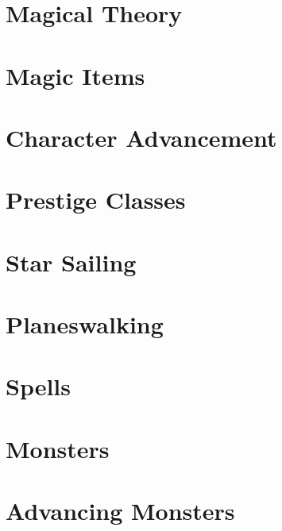 \documentclass[12pt,oneside,onecolumn,openany,final]{memoir}
\begin{document}
\chapter{Magical Theory}
\clearpage{}
\chapter{Magic Items}
\clearpage{}
\chapter{Character Advancement}
\clearpage{}
\chapter{Prestige Classes}
\clearpage{}
\chapter{Star Sailing}
\clearpage{}
\chapter{Planeswalking}

\appendix{}
\appendixpage{}

\makeatletter{}
\renewcommand{\@makechapterhead}[1]{%
\vspace*{0 pt}{%
\raggedright \normalfont \fontsize{32}{32} \selectfont \bfseries%
\ifnum \value{secnumdepth}>-1%
  \if@mainmatter \vspace{-8pt} {\fontsize{20}{20} \selectfont Appendix \thechapter:}\\[8pt]%
  \fi%
\fi
\hspace{0.65cm} #1\par\nobreak\vspace{20 pt}%
}}
\makeatother{}

\clearpage{}
\chapter{Spells}
\clearpage{}
\chapter{Monsters}
\clearpage{}
\chapter{Advancing Monsters}

\clearpage{}


\clearpage{}


\clearpage{}
\glsaddall{}
\printglossaries{}

\clearpage{}
\listoftables{}

\clearpage{}
\printindex{}
\end{document}

